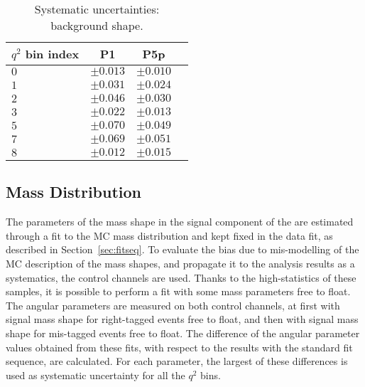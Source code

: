 \begin{table*}[!htb]
  \begin {center}
    \begin{small}
      \caption{Systematic uncertainties: background shape.
        \label{tab:bkg. shape}}
      \begin{tabular}{|l|c|c|c|}
        \hline
        $q^2$ bin index   & P1 & P5p \\
        \hline
        $ 0 $    &   $\pm0.013$ & $\pm0.010 $   \\
        $ 1 $    &   $\pm0.031$ & $\pm0.024 $   \\
        $ 2 $    &   $\pm0.046$ & $\pm0.030 $   \\
        $ 3 $    &   $\pm0.022$ & $\pm0.013 $   \\
        $ 5 $    &   $\pm0.070$ & $\pm0.049 $   \\
        $ 7 $    &   $\pm0.069$ & $\pm0.051 $   \\
        $ 8 $    &   $\pm0.012$ & $\pm0.015 $   \\
        \hline
      \end{tabular}
    \end{small}
  \end{center}
\end{table*}

\subsection{Mass Distribution}
\label{sec:sys-mass distribution}



The parameters of the mass shape in the signal component of the \pdf are estimated through a fit to the MC mass distribution and kept fixed in the data fit, as described in Section~\ref{sec:fitseq}.
To evaluate the bias due to mis-modelling of the MC description of the mass shapes, and propagate it to the analysis results as a systematics, the control channels are used.
Thanks to the high-statistics of these samples, it is possible to perform a fit with some mass parameters free to float.
The angular parameters are measured on both control channels, at first with signal mass shape for right-tagged events free to float, and then with signal mass shape for mis-tagged events free to float.
The difference of the angular parameter values obtained from these fits, with respect to the results with the standard fit sequence, are calculated.
For each parameter, the largest of these differences is used as systematic uncertainty for all the $q^2$ bins.

